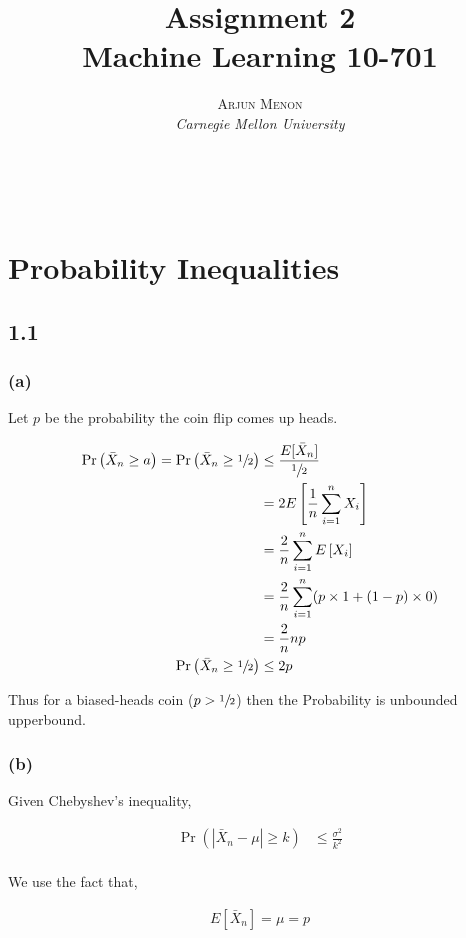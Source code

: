 \documentclass[letterpaper,10pt]{article} %
\title{\textbf{Assignment 2}\\ %
Machine Learning 10-701} %
\author{\textsc{Arjun Menon} %
\\{\textit{Carnegie Mellon University}}} %
\makeatletter
\newcommand{\pr}[1]{\Pr\left( #1 \right)}
\renewcommand{\maketitle}{ %
\begin{flushright} %
{\LARGE\@title} %

{\large\@author} %
\\\@date %

\end{flushright}
}
\makeatother
\begin{document}
\maketitle %

\section{Probability Inequalities}

\subsection{1.1}

\subsubsection*{(a)}

Let $p$ be the probability the coin flip comes up heads.

\begin{align*}
\pr{\bar{X}_n \geq a} = \pr{\bar{X}_n \geq \sfrac{1}{2}} &\leq \frac{E[\bar{X}_n]}{\sfrac{1}{2}} \\
&= 2 E\left[ \frac{1}{n} \sum^n_{i=1} X_i \right] \\
&= \frac{2}{n} \sum^n_{i=1} E\left[ X_i \right] \\
&= \frac{2}{n} \sum^n_{i=1} (p \times 1 + (1-p) \times 0) \\
&= \frac{2}{n} n p \\
\pr{\bar{X}_n \geq \sfrac{1}{2}} &\leq 2p \\
\end{align*}

Thus for a biased-heads coin ($ p>\sfrac{1}{2} $) then the Probability is unbounded upperbound.

\subsubsection*{(b)}

Given Chebyshev's inequality,

\begin{align*}
\pr{\left|\bar{X}_n - \mu\right| \geq k} &\leq \frac{\sigma^2}{k^2}\\
\end{align*}

We use the fact that,

\begin{align*}
E\left[ \bar{X}_n \right] = \mu = p\\
\end{align*}
\end{document}
